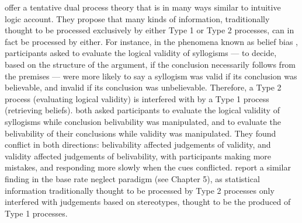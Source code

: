 
\citet{Handley2015} offer a tentative dual process theory
that is in many ways similar to  intuitive logic account.
They propose that many kinds of information,
traditionally thought to be processed exclusively by
either Type 1 or Type 2 processes, can in fact be processed by either.
For instance, in the phenomena known as belief bias \citep{Evans1983},
participants asked to evaluate the logical validity of syllogisms
--- to decide, based on the structure of the argument,
if the conclusion necessarily follows from the premises ---
were more likely to say a syllogism was valid if
its conclusion was believable,
and invalid if its conclusion was unbelievable.
Therefore, a Type 2 process (evaluating logical validity)
is interfered with by a Type 1 process (retrieving beliefs).
\citet{Handley2011} both asked participants
to evaluate the logical validity of syllogisms
while conclusion belivability was manipulated,
and to evaluate the belivability of their conclusions
while validity was manipulated.
They found conflict in both directions:
belivability affected judgements of validity,
and validity affected judgements of belivability,
with participants making more mistakes, and responding more slowly
when the cues conflicted.
\citet{Pennycook2014} report a similar finding
in the base rate neglect paradigm (see Chapter 5),
as statistical information traditionally thought
to be processed by Type 2 processes only
interfered with judgements based on stereotypes,
thought to be the produced of Type 1 processes.

